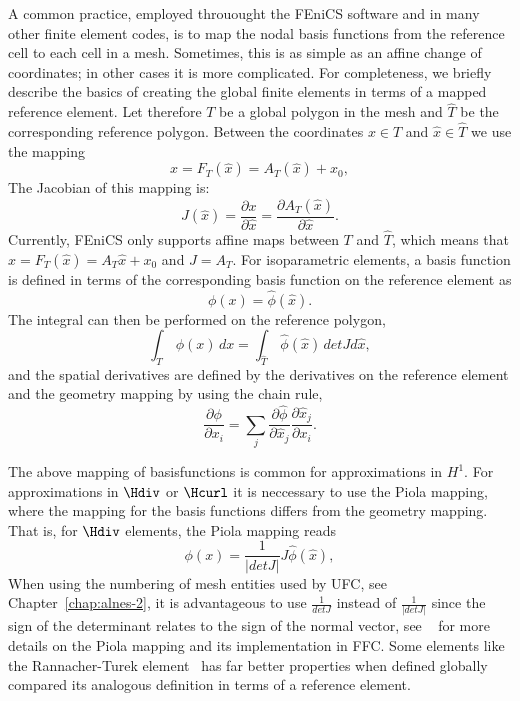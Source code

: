 A common practice, employed throuought the FEniCS
software and in many other finite element codes, is to map the nodal
basis functions from the reference cell to each cell in a mesh.
Sometimes, this is as simple as an affine change of coordinates; in
other cases it is more complicated.
For completeness, we briefly describe the basics of creating the global finite elements in terms of a mapped
reference element. Let therefore $T$ be a global polygon in the mesh and $\hat{T}$ be the corresponding reference polygon.
Between the coordinates
$x\in T$ and $\hat x\in\hat T$ we use the mapping
\begin{equation}
\label{eq:geometry}
x = F_T(\hat x) = A_T(\hat x)  + x_0,
\end{equation}
The Jacobian of this mapping is: 
\begin{equation}
\label{eq:geometry2}
J(\hat x) =  \frac{\partial x }{\partial \hat x}  =    \frac{\partial A_T(\hat x) }{\partial \hat x} .
\end{equation}
Currently, FEniCS only supports affine maps between $T$ and $\hat{T}$, which means that 
$x = F_T(\hat x) = A_T\hat x  + x_0$ and $J=A_T$.
For isoparametric elements, a basis function is defined in terms of the corresponding basis function
on the reference element as
\begin{equation}
\label{eq:subs}
\phi(x) = \hat{\phi}(\hat x). 
\end{equation}
The integral can then be performed on the reference polygon,
\begin{equation}
\label{eq:integration2}
\int_T \, \phi (x) \, dx = \int_{\hat{T}} \, \hat \phi (\hat x) \, detJ d\hat x ,
\end{equation}
and the spatial derivatives are defined by the derivatives on the
reference element and the geometry mapping by using the
chain rule,
\begin{equation}
\label{eq:chain}
\frac{\partial \phi}{\partial x_i} =
\sum_j \frac{\partial \hat \phi}{\partial \hat x_j} \frac{\partial \hat x_j }{\partial x_i }  .
\end{equation}

The above mapping of basisfunctions is common for approximations in $H^1$. For approximations in $\Hdiv$ or
$\Hcurl$ it is neccessary to use the Piola mapping, where the mapping for the basis functions
differs from the geometry mapping. That is, for $\Hdiv$ elements, the Piola mapping reads  
\begin{equation}
\label{eq:subs}
\phi(x) = \frac{1}{|detJ|} J \hat{\phi}(\hat x),
\end{equation}
When using the numbering of mesh entities used by UFC, see Chapter~\ref{chap:alnes-2}, it is advantageous to use $\frac{1}{detJ}$ instead of $\frac{1}{|detJ|}$ since the sign of the determinant relates to the sign of the normal vector,     
see ~\citep{RognesKirbyLogg2009} for more details on the Piola mapping and its implementation in FFC.   
Some elements like the Rannacher-Turek element~\citep{Turek1999,RannacherTurek1992} has far better
properties when defined globally compared its analogous definition in terms
of a reference element.


